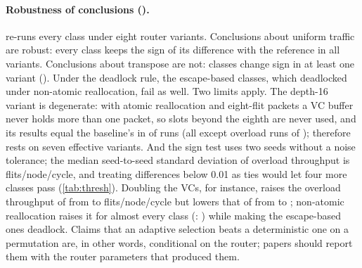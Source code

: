 \begin{table}[tbp]
\centering
\caption{Load balance and fairness (). Router-load Jain index on uniform traffic (ERA grid); per-source accepted-throughput Jain index (minimum) and max/mean source latency (mean) over stress runs on uniform traffic; longest VC-allocation wait.}
\label{tab:d6}
\small

\end{table}

\paragraph{Robustness of conclusions ().}  re-runs every class under eight router variants. Conclusions about uniform traffic are robust: every class keeps the sign of its difference with the reference in all variants. Conclusions about transpose are not:  classes change sign in at least one variant (). Under the deadlock rule, the escape-based classes, which deadlocked under non-atomic reallocation, fail  as well. Two limits apply. The depth-16 variant is degenerate: with atomic reallocation and eight-flit packets a VC buffer never holds more than one packet, so slots beyond the eighth are never used, and its results equal the baseline's in  of  runs (all except overload runs of );  therefore rests on seven effective variants. And the sign test uses two seeds without a noise tolerance; the median seed-to-seed standard deviation of overload throughput is  flits/node/cycle, and treating differences below 0.01 as ties would let four more classes pass (\cref{tab:thresh}). Doubling the VCs, for instance, raises the overload throughput of  from  to  flits/node/cycle but lowers that of  from  to ; non-atomic reallocation raises it for almost every class (: ) while making the escape-based ones deadlock. Claims that an adaptive selection beats a deterministic one on a permutation are, in other words, conditional on the router; papers should report them with the router parameters that produced them.

\begin{table}[tbp]
\centering
\caption{Robustness of conclusions (). Accepted throughput at overload (uniform, offered 0.6 flits/node/cycle, two seeds) under eight router variants, and number of variants in which the class is above/below the reference on uniform and transpose traffic (exact ties counted in neither column). $^\ddagger$At least one deadlocked run.}
\label{tab:d12}
\scriptsize
\setlength{\tabcolsep}{3pt}

\end{table}

